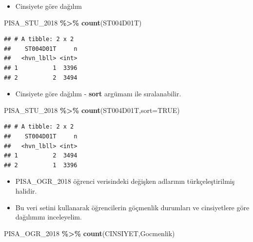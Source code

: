 \documentclass[
  oneside]{book}
\newenvironment{Shaded}{\begin{snugshade}}{\end{snugshade}}
\newcommand{\AttributeTok}[1]{\textcolor[rgb]{0.13,0.29,0.53}{#1}}
\newcommand{\ConstantTok}[1]{\textcolor[rgb]{0.56,0.35,0.01}{#1}}
\newcommand{\FunctionTok}[1]{\textcolor[rgb]{0.13,0.29,0.53}{\textbf{#1}}}
\newcommand{\NormalTok}[1]{#1}
\newcommand{\SpecialCharTok}[1]{\textcolor[rgb]{0.81,0.36,0.00}{\textbf{#1}}}
\providecommand{\tightlist}{%
  \setlength{\itemsep}{0pt}\setlength{\parskip}{0pt}}
\begin{document}
\begin{itemize}
\tightlist
\item
  Cinsiyete göre dağılım
  👦 👧
\end{itemize}

\begin{Shaded}
\begin{Highlighting}[]
\NormalTok{PISA\_STU\_2018 }\SpecialCharTok{\%\textgreater{}\%} \FunctionTok{count}\NormalTok{(ST004D01T)}
\end{Highlighting}
\end{Shaded}

\begin{verbatim}
## # A tibble: 2 x 2
##    ST004D01T     n
##   <hvn_lbll> <int>
## 1          1  3396
## 2          2  3494
\end{verbatim}

\begin{itemize}
\tightlist
\item
  Cinsiyete göre dağılım - \textbf{sort} argümanı ile sıralanabilir.
  👦 👧
\end{itemize}

\begin{Shaded}
\begin{Highlighting}[]
\NormalTok{PISA\_STU\_2018 }\SpecialCharTok{\%\textgreater{}\%} \FunctionTok{count}\NormalTok{(ST004D01T,}\AttributeTok{sort=}\ConstantTok{TRUE}\NormalTok{)}
\end{Highlighting}
\end{Shaded}

\begin{verbatim}
## # A tibble: 2 x 2
##    ST004D01T     n
##   <hvn_lbll> <int>
## 1          2  3494
## 2          1  3396
\end{verbatim}

\begin{itemize}
\item
  PISA\_OGR\_2018 öğrenci verisindeki değişken adlarının türkçeleştirilmiş halidir.
\item
  Bu veri setini kullanarak öğrencilerin göçmenlik durumları ve cinsiyetlere göre dağılımını inceleyelim.
\end{itemize}

\begin{Shaded}
\begin{Highlighting}[]
\NormalTok{PISA\_OGR\_2018 }\SpecialCharTok{\%\textgreater{}\%} \FunctionTok{count}\NormalTok{(CINSIYET,Gocmenlik)}
\end{Highlighting}
\end{Shaded}
\end{document}
